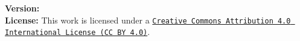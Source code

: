 \documentclass[12pt,letterpaper,oneside,reqno]{amsart}
\newcommand \coeffA [3][A] {{\mathbf{#1}} \sb{#2,#3}}
\newcommand \polynomialP [4][P]{{\mathbf{#1}}\sp{#2} \sb{#3}(#4)}
\numberwithin{equation}{section}
\begin{document}
    \noindent \textbf{Version:} 
    \\[1em]
    \noindent \textbf{License:} This work is licensed under a
    \href{https://creativecommons.org/licenses/by/4.0/}
    {\texttt{Creative Commons Attribution 4.0 International License (CC BY 4.0)}}.

%    
%
%
%    
%
%
%    
\end{document}
